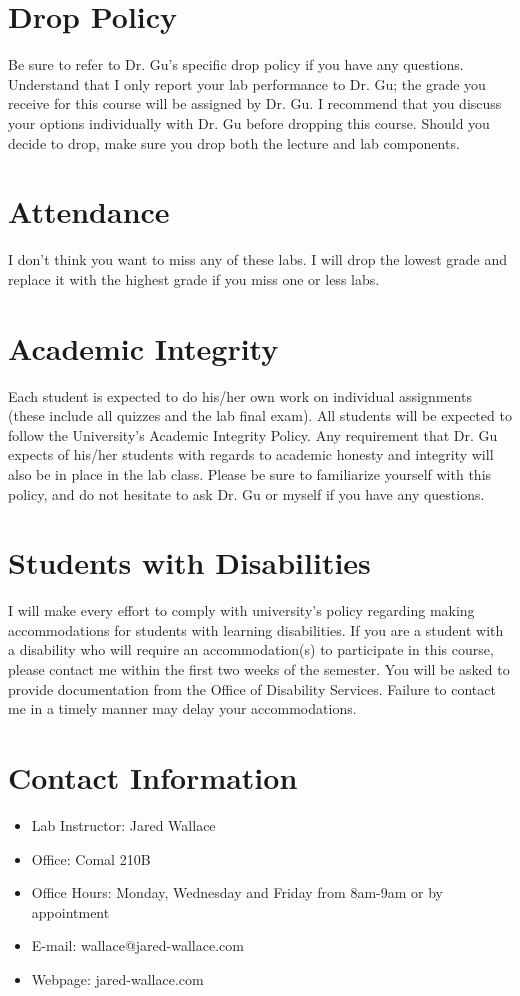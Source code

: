 \documentclass[letterpaper,12pt]{article}
\begin{document}
\section*{Drop Policy}
Be sure to refer to Dr. Gu's specific drop policy if you have any
questions. Understand that I only report your lab performance to Dr. Gu;
the grade you receive for this course will be assigned by Dr. Gu.
I recommend that you discuss your options individually with Dr. Gu
before dropping this course. Should you decide to drop, make sure you
drop both the lecture and lab components.

\section*{Attendance}
I don't think you want to miss any of these labs. I will drop the lowest
grade and replace it with the highest grade if you miss one or less labs.

\section*{Academic Integrity}
Each student is expected to do his/her own work on individual assignments
(these include all quizzes and the lab final exam). All students will be expected to
follow the University's Academic Integrity Policy. Any requirement that Dr. Gu
expects of his/her students with regards to academic honesty and
integrity will also be in place in the lab class. Please be sure to familiarize yourself
with this policy, and do not hesitate to ask Dr. Gu or myself if you
have any questions.

\section*{Students with Disabilities}
I will make every effort to comply with university's policy regarding making
accommodations for students with learning disabilities. If you are a student with a
disability who will require an accommodation(s) to participate in this course, please
contact me within the first two weeks of the semester. You will be asked to provide
documentation from the Office of Disability Services. Failure to contact me in a
timely manner may delay your accommodations.

\section*{Contact Information}
\begin{itemize}
    \item Lab Instructor: Jared Wallace
    \item Office: Comal 210B
    \item Office Hours: Monday, Wednesday and Friday from 8am-9am or by appointment
    \item E-mail: wallace@jared-wallace.com
    \item Webpage: jared-wallace.com
\end{itemize}
\end{document}

